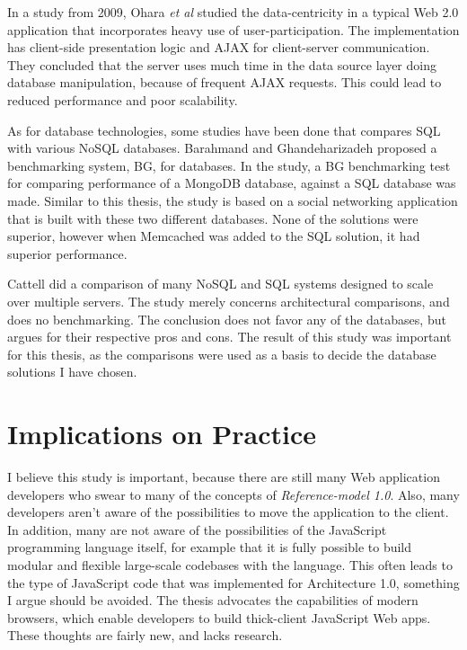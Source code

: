 In a study from 2009, Ohara \textit{et al}\cite{4919645} studied the data-centricity in a typical Web 2.0 application that incorporates heavy use of user-participation. The implementation has client-side presentation logic and AJAX for client-server communication. They concluded that the server uses much time in the data source layer doing database manipulation, because of frequent AJAX requests. This could lead to reduced performance and poor scalability.

As for database technologies, some studies have been done that compares SQL with various NoSQL databases. 
Barahmand and Ghandeharizadeh\cite{mongsql3} proposed a benchmarking system, BG, for databases. In the study, a BG benchmarking test for comparing performance of a MongoDB database, against a SQL database was made. Similar to this thesis, the study is based on a social networking application that is built with these two different databases. None of the solutions were superior, however when Memcached was added to the SQL solution, it had superior performance.

Cattell\cite{sqlscale} did a comparison of many NoSQL and SQL systems designed to scale over multiple servers. The study merely concerns architectural comparisons, and does no benchmarking. The conclusion does not favor any of the databases, but argues for their respective pros and cons. The result of this study was important for this thesis, as the comparisons were used as a basis to decide the database solutions I have chosen.


\section{Implications on Practice}
I believe this study is important, because there are still many Web application developers who swear to many of the concepts of \textit{Reference-model 1.0}. Also, many developers aren't aware of the possibilities to move the application to the client. In addition, many are not aware of the possibilities of the JavaScript programming language itself, for example that it is fully possible to build modular and flexible large-scale codebases with the language. This often leads to the type of JavaScript code that was implemented for Architecture 1.0, something I argue should be avoided. The thesis advocates the capabilities of modern browsers, which enable developers to build thick-client JavaScript Web apps. These thoughts are fairly new, and lacks research.

